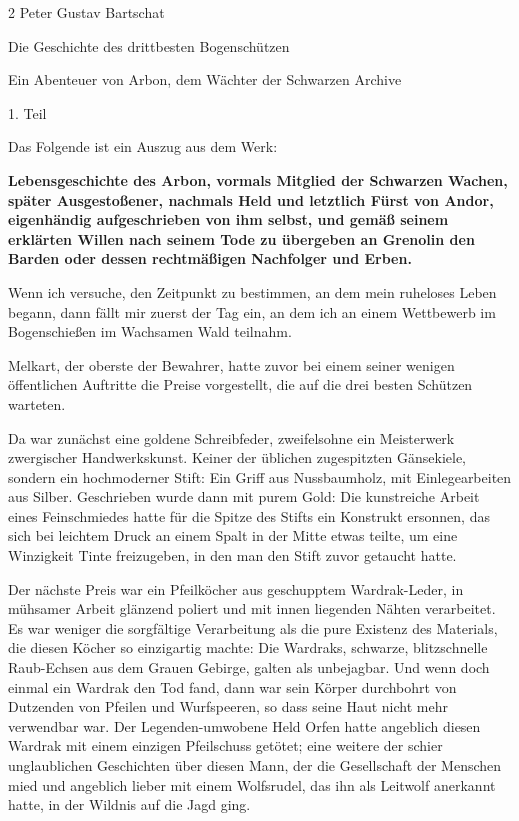 \documentclass[10pt, a4paper, oneside]{book}
\begin{document}
\begin{multicols}{2}
Peter Gustav Bartschat

Die Geschichte des drittbesten Bogenschützen

Ein Abenteuer von Arbon, dem Wächter der Schwarzen Archive

1. Teil\bigskip

Das Folgende ist ein Auszug aus dem Werk:

\textbf{Lebensgeschichte des Arbon, vormals Mitglied der Schwarzen Wachen, später Ausgestoßener, nachmals Held und letztlich Fürst von Andor, eigenhändig aufgeschrieben von ihm selbst, und gemäß seinem erklärten Willen nach seinem Tode zu übergeben an Grenolin den Barden oder dessen rechtmäßigen Nachfolger und Erben.}\bigskip

Wenn ich versuche, den Zeitpunkt zu bestimmen, an dem mein ruheloses Leben begann, dann fällt mir zuerst der Tag ein, an dem ich an einem Wettbewerb im Bogenschießen im Wachsamen Wald teilnahm.

Melkart, der oberste der Bewahrer, hatte zuvor bei einem seiner wenigen öffentlichen Auftritte die Preise vorgestellt, die auf die drei besten Schützen warteten.

Da war zunächst eine goldene Schreibfeder, zweifelsohne ein Meisterwerk zwergischer Handwerkskunst. Keiner der üblichen zugespitzten Gänsekiele, sondern ein hochmoderner Stift: Ein Griff aus Nussbaumholz, mit Einlegearbeiten aus Silber. Geschrieben wurde dann mit purem Gold: Die kunstreiche Arbeit eines Feinschmiedes hatte für die Spitze des Stifts ein Konstrukt ersonnen, das sich bei leichtem Druck an einem Spalt in der Mitte etwas teilte, um eine Winzigkeit Tinte freizugeben, in den man den Stift zuvor getaucht hatte.

Der nächste Preis war ein Pfeilköcher aus geschupptem Wardrak-Leder, in mühsamer Arbeit glänzend poliert und mit innen liegenden Nähten verarbeitet. Es war weniger die sorgfältige Verarbeitung als die pure Existenz des Materials, die diesen Köcher so einzigartig machte: Die Wardraks, schwarze, blitzschnelle Raub-Echsen aus dem Grauen Gebirge, galten als unbejagbar. Und wenn doch einmal ein Wardrak den Tod fand, dann war sein Körper durchbohrt von Dutzenden von Pfeilen und Wurfspeeren, so dass seine Haut nicht mehr verwendbar war. Der Legenden-umwobene Held Orfen hatte angeblich diesen Wardrak mit einem einzigen Pfeilschuss getötet; eine weitere der schier unglaublichen Geschichten über diesen Mann, der die Gesellschaft der Menschen mied und angeblich lieber mit einem Wolfsrudel, das ihn als Leitwolf anerkannt hatte, in der Wildnis auf die Jagd ging.


\end{multicols}
\end{document}
